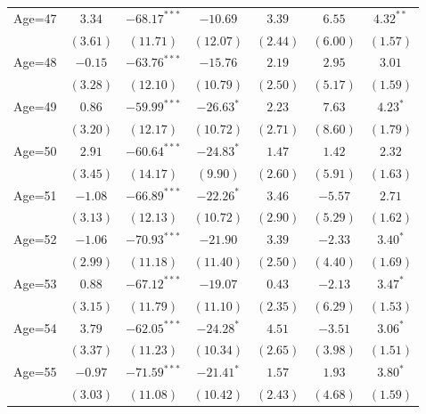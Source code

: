 \documentclass[fullpage]{paper}
\begin{document}
\begin{center}
\begin{longtable}{l c c c c c c }
Age=47      & $3.34$       & $-68.17^{***}$ & $-10.69$      & $3.39$       & $6.55$        & $4.32^{**}$   \\
            & $(3.61)$     & $(11.71)$      & $(12.07)$     & $(2.44)$     & $(6.00)$      & $(1.57)$      \\
Age=48      & $-0.15$      & $-63.76^{***}$ & $-15.76$      & $2.19$       & $2.95$        & $3.01$        \\
            & $(3.28)$     & $(12.10)$      & $(10.79)$     & $(2.50)$     & $(5.17)$      & $(1.59)$      \\
Age=49      & $0.86$       & $-59.99^{***}$ & $-26.63^{*}$  & $2.23$       & $7.63$        & $4.23^{*}$    \\
            & $(3.20)$     & $(12.17)$      & $(10.72)$     & $(2.71)$     & $(8.60)$      & $(1.79)$      \\
Age=50      & $2.91$       & $-60.64^{***}$ & $-24.83^{*}$  & $1.47$       & $1.42$        & $2.32$        \\
            & $(3.45)$     & $(14.17)$      & $(9.90)$      & $(2.60)$     & $(5.91)$      & $(1.63)$      \\
Age=51      & $-1.08$      & $-66.89^{***}$ & $-22.26^{*}$  & $3.46$       & $-5.57$       & $2.71$        \\
            & $(3.13)$     & $(12.13)$      & $(10.72)$     & $(2.90)$     & $(5.29)$      & $(1.62)$      \\
Age=52      & $-1.06$      & $-70.93^{***}$ & $-21.90$      & $3.39$       & $-2.33$       & $3.40^{*}$    \\
            & $(2.99)$     & $(11.18)$      & $(11.40)$     & $(2.50)$     & $(4.40)$      & $(1.69)$      \\
Age=53      & $0.88$       & $-67.12^{***}$ & $-19.07$      & $0.43$       & $-2.13$       & $3.47^{*}$    \\
            & $(3.15)$     & $(11.79)$      & $(11.10)$     & $(2.35)$     & $(6.29)$      & $(1.53)$      \\
Age=54      & $3.79$       & $-62.05^{***}$ & $-24.28^{*}$  & $4.51$       & $-3.51$       & $3.06^{*}$    \\
            & $(3.37)$     & $(11.23)$      & $(10.34)$     & $(2.65)$     & $(3.98)$      & $(1.51)$      \\
Age=55      & $-0.97$      & $-71.59^{***}$ & $-21.41^{*}$  & $1.57$       & $1.93$        & $3.80^{*}$    \\
            & $(3.03)$     & $(11.08)$      & $(10.42)$     & $(2.43)$     & $(4.68)$      & $(1.59)$      \\

\end{longtable}
\end{center}
\end{document}
